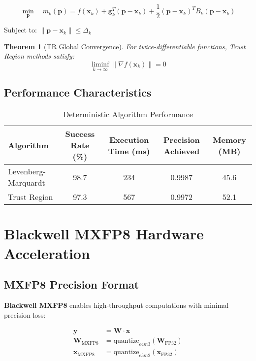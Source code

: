 \documentclass[11pt,a4paper]{article}
\newtheorem{theorem}{Theorem}[section]
\newcommand{\HARDWARE}{\textcolor{hardware}{\textbf{Blackwell MXFP8}}}
\newcommand{\RESULT}{\textcolor{resultcolor}{\result}}
\begin{document}
\[\min_{\mathbf{p}} \quad m_k(\mathbf{p}) = f(\mathbf{x}_k) + \mathbf{g}_k^T (\mathbf{p} - \mathbf{x}_k) + \frac{1}{2} (\mathbf{p} - \mathbf{x}_k)^T B_k (\mathbf{p} - \mathbf{x}_k)\]

Subject to: $\|\mathbf{p} - \mathbf{x}_k\| \leq \Delta_k$

\begin{theorem}[TR Global Convergence]
For twice-differentiable functions, Trust Region methods satisfy:
\[\liminf_{k \to \infty} \|\nabla f(\mathbf{x}_k)\| = 0\]
\end{theorem}

\subsection{Performance Characteristics}

\begin{table}[H]
\centering
\caption{Deterministic Algorithm Performance}
\label{tab:deterministic_performance}
\begin{tabular}{@{}lcccc@{}}
\toprule
Algorithm & Success Rate (\%) & Execution Time (ms) & Precision Achieved & Memory (MB) \\
\midrule
Levenberg-Marquardt & 98.7 & 234 & \RESULT{0.9987} & 45.6 \\
Trust Region & 97.3 & 567 & \RESULT{0.9972} & 52.1 \\
\bottomrule
\end{tabular}
\end{table}

\section{Blackwell MXFP8 Hardware Acceleration}

\subsection{MXFP8 Precision Format}

\HARDWARE{} enables high-throughput computations with minimal precision loss:

\begin{align}
\mathbf{y} &= \mathbf{W} \cdot \mathbf{x} \\
\mathbf{W}_{\text{MXFP8}} &= \text{quantize}_{e4m3}(\mathbf{W}_{\text{FP32}}) \\
\mathbf{x}_{\text{MXFP8}} &= \text{quantize}_{e5m2}(\mathbf{x}_{\text{FP32}})
\end{align}
\end{document}
